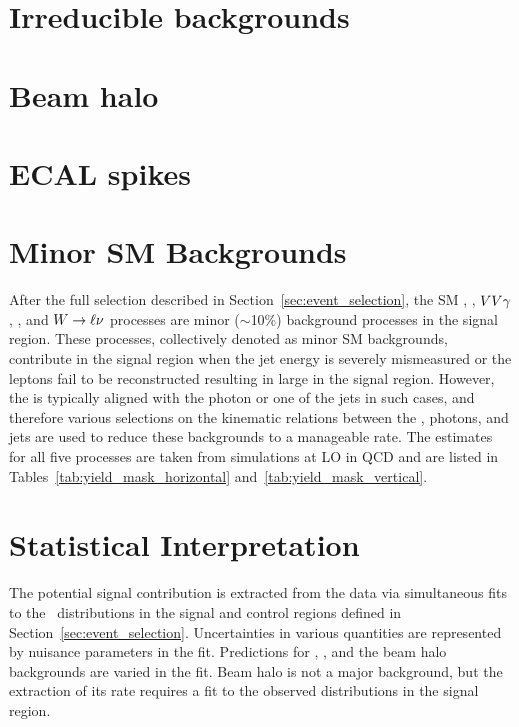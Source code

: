 

\section{Irreducible backgrounds}
\label{sec:irreducible}



\section{Beam halo}
\label{sec:halo_estimate}



\section{ECAL spikes}
\label{sec:spike_estimate}



\section{Minor SM Backgrounds}
\label{sec:minorsm}

After the full selection described in Section~\ref{sec:event_selection}, the SM \gj, \ttg, $VV\gamma$, \zllg, and ${W}\to\ell\nu$ processes are minor ($\sim$10\%) background processes in the signal region. 
These processes, collectively denoted as minor SM backgrounds, contribute in the signal region when the jet energy is severely mismeasured or the leptons fail to be reconstructed resulting in large \met in the signal region. 
However, the \met is typically aligned with the photon or one of the jets in such cases, and therefore various selections on the kinematic relations between the \met, photons, and jets are used to reduce these backgrounds to a manageable rate. 
The estimates for all five processes are taken from \MGvATNLO simulations at LO in QCD and are listed in Tables~\ref{tab:yield_mask_horizontal} and~\ref{tab:yield_mask_vertical}.

\section{Statistical Interpretation}
\label{sec:interpretation}

The potential signal contribution is extracted from the data via simultaneous fits to the
\ETg\ distributions in the signal and control regions defined in Section~\ref{sec:event_selection}. 
Uncertainties in various quantities are represented by nuisance parameters in the fit. 
Predictions for \zinvg, \wlng, and the beam halo backgrounds are varied in the fit. 
Beam halo is not a major background, but the extraction of its rate requires a fit to the observed distributions in the signal region.

